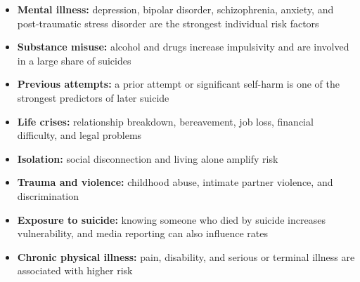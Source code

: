 \begin{itemize}
    \item \textbf{Mental illness:} depression, bipolar disorder, schizophrenia, anxiety, and post-traumatic stress disorder are the strongest individual risk factors
    \item \textbf{Substance misuse:} alcohol and drugs increase impulsivity and are involved in a large share of suicides
    \item \textbf{Previous attempts:} a prior attempt or significant self-harm is one of the strongest predictors of later suicide
    \item \textbf{Life crises:} relationship breakdown, bereavement, job loss, financial difficulty, and legal problems
    \item \textbf{Isolation:} social disconnection and living alone amplify risk
    \item \textbf{Trauma and violence:} childhood abuse, intimate partner violence, and discrimination
    \item \textbf{Exposure to suicide:} knowing someone who died by suicide increases vulnerability, and media reporting can also influence rates
    \item \textbf{Chronic physical illness:} pain, disability, and serious or terminal illness are associated with higher risk
\end{itemize}

